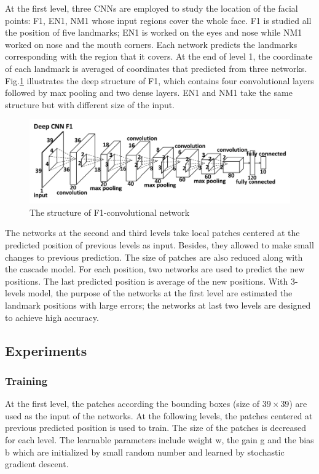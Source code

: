 \documentclass[12pt,a4paper]{article}
\begin{document}
At the first level, three CNNs are employed to study the location of the facial points: F1, EN1, NM1 whose input regions cover the whole face. F1 is studied all the position of five landmarks; EN1 is worked on the eyes and nose while NM1 worked on nose and the mouth corners. Each network predicts the landmarks corresponding with the region that it covers. At the end of level 1, the coordinate of each landmark is averaged of coordinates that predicted from three networks. Fig.\ref{1Fconv} illustrates the deep structure of F1, which contains four convolutional layers followed by max pooling and two dense layers. EN1 and NM1 take the same structure but with different size of the input.
\begin{figure}[h]
	\centering
	\includegraphics[scale=0.3]{images/1Fconv}
	\caption{The structure of F1-convolutional network}
	\label{1Fconv}
\end{figure}

The networks at the second and third levels take local patches centered at the predicted position of previous levels as input. Besides, they allowed to make small changes to previous prediction. The size of patches are also reduced along with the cascade model. For each position, two networks are used to predict the new positions. The last predicted position is average of the new positions. With 3-levels model, the purpose of the networks at the first level are estimated the landmark positions with large errors; the networks at last two levels are designed to achieve high accuracy.
\subsection{Experiments}
\subsubsection{Training}
At the first level, the patches according the bounding boxes (size of $39 \times 39$) are used as the input of the networks. At the following levels, the patches centered at previous predicted position is used to train. The size of the patches is decreased for each level. The learnable parameters include weight w, the gain g and the bias b which are initialized by small random number and learned by stochastic gradient descent.
\end{document}
